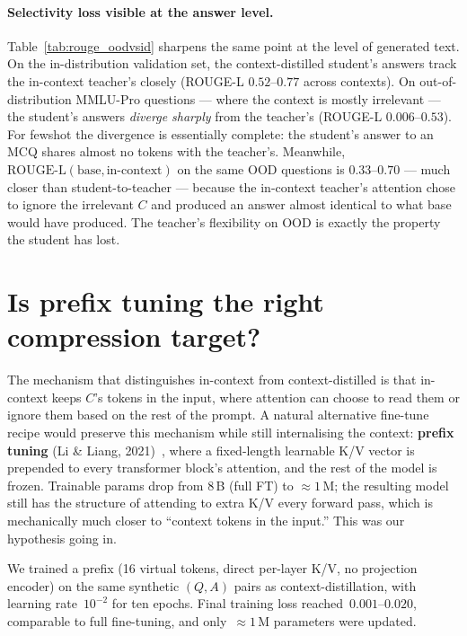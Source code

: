 \documentclass[letterpaper]{article} %
\begin{document}
\paragraph{Selectivity loss visible at the answer level.}
Table~\ref{tab:rouge_oodvsid} sharpens the same point at the level
of generated text. On the in-distribution validation set, the
context-distilled student's answers track the in-context teacher's
closely (ROUGE-L $0.52$--$0.77$ across contexts). On
out-of-distribution MMLU-Pro questions --- where the context is
mostly irrelevant --- the student's answers \emph{diverge sharply}
from the teacher's (ROUGE-L $0.006$--$0.53$). For fewshot the
divergence is essentially complete: the student's answer to an MCQ
shares almost no tokens with the teacher's. Meanwhile,
$\text{ROUGE-L}(\text{base}, \text{in-context})$ on the same OOD
questions is $0.33$--$0.70$ --- much closer than student-to-teacher
--- because the in-context teacher's attention chose to ignore the
irrelevant $C$ and produced an answer almost identical to what base
would have produced. The teacher's flexibility on OOD is exactly
the property the student has lost.



\section{Is prefix tuning the right compression target?}
\label{sec:prefix}

The mechanism that distinguishes in-context from context-distilled is that
in-context keeps $C$'s tokens in the input, where attention can choose to
read them or ignore them based on the rest of the prompt. A natural
alternative fine-tune recipe would preserve this mechanism while still
internalising the context: \textbf{prefix tuning} (Li \& Liang,
2021)~\citep{li2021prefix}, where a fixed-length learnable K/V vector is
prepended to every transformer block's attention, and the rest of the
model is frozen. Trainable params drop from $8$\,B (full FT) to
$\approx$$1$\,M; the resulting model still has the structure of attending
to extra K/V every forward pass, which is mechanically much closer to
``context tokens in the input.'' This was our hypothesis going in.

We trained a prefix (16 virtual tokens, direct per-layer K/V, no
projection encoder) on the same synthetic $(Q, A)$ pairs as
context-distillation, with learning rate~$10^{-2}$ for ten epochs.
Final training loss reached~$0.001$--$0.020$, comparable to full
fine-tuning, and only~$\approx 1$\,M parameters were updated.
\end{document}
